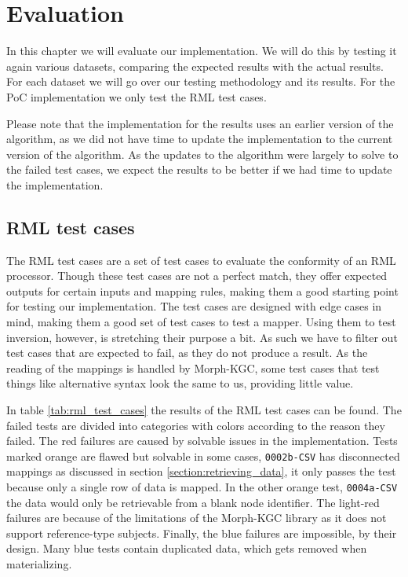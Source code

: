 \chapter{Evaluation}
\label{chapter:evaluation}
In this chapter we will evaluate our implementation. We will do this by testing it again various datasets, comparing the expected results with the actual results. For each dataset we will go over our testing methodology and its results. For the PoC implementation we only test the RML test cases. 

Please note that the implementation for the results uses an earlier version of the algorithm, as we did not have time to update the implementation to the current version of the algorithm. As the updates to the algorithm were largely to solve to the failed test cases, we expect the results to be better if we had time to update the implementation.

\section{RML test cases}
\label{section:rml_test_cases}
The RML test cases \citep{rml-test-cases} are a set of test cases to evaluate the conformity of an RML processor. Though these test cases are not a perfect match, they offer expected outputs for certain inputs and mapping rules, making them a good starting point for testing our implementation. The test cases are designed with edge cases in mind, making them a good set of test cases to test a mapper. Using them to test inversion, however, is stretching their purpose a bit. As such we have to filter out test cases that are expected to fail, as they do not produce a result. As the reading of the mappings is handled by Morph-KGC, some test cases that test things like alternative syntax look the same to us, providing little value.

In table \ref{tab:rml_test_cases} the results of the RML test cases can be found. The failed tests are divided into categories with colors according to the reason they failed. The red failures are caused by solvable issues in the implementation. Tests marked orange are flawed but solvable in some cases, \texttt{0002b-CSV} has disconnected mappings as discussed in section \ref{section:retrieving_data}, it only passes the test because only a single row of data is mapped. In the other orange test, \texttt{0004a-CSV} the data would only be retrievable from a blank node identifier. The light-red failures are because of the limitations of the Morph-KGC library as it does not support reference-type subjects. Finally, the blue failures are impossible, by their design. Many blue tests contain duplicated data, which gets removed when materializing.

